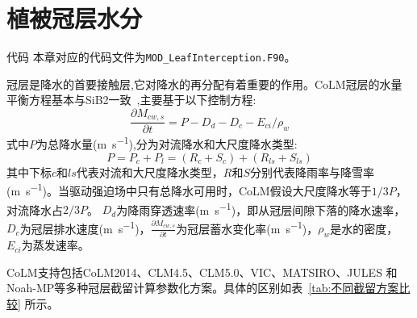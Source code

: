 
\chapter{植被冠层水分}\label{植被冠层截留}

\begin{mymdframed}{代码}
本章对应的代码文件为\texttt{MOD\_LeafInterception.F90}。
\end{mymdframed}

冠层是降水的首要接触层,它对降水的再分配有着重要的作用。CoLM冠层的水量平衡方程基本与SiB2一致~\citep{sellers1996revised},主要基于以下控制方程:
\begin{equation}\label{eq:冠层水量控制方程}
\frac{\partial M_{cw,s}}{\partial t} = P-D_{d}-D_{c}-E_{ci} / \rho_{w}
\end{equation}
式中$P$为总降水量(\unit{m.s^{-1}}),分为对流降水和大尺度降水类型:
\begin{equation}\label{eq:降水类型}
P=P_{c}+P_{l}=\left(R_{c}+S_{c}\right)+\left(R_{ls}+S_{ls}\right)
\end{equation}
其中下标$c$和$ls$代表对流和大尺度降水类型，$R$和$S$分别代表降雨率与降雪率(\unit{m.s^{-1}})。当驱动强迫场中只有总降水可用时，CoLM假设大尺度降水等于$1/3P$，对流降水占$2/3P$。
$D_d$为降雨穿透速率(\unit{m.s^{-1}})，即从冠层间隙下落的降水速率，$D_c$为冠层排水速度(\unit{m.s^{-1}})，$\frac{\partial M_{cw,s}}{\partial t}$为冠层蓄水变化率(\unit{m.s^{-1}})，$\rho_w$是水的密度，$E_{ci}$为蒸发速率。

CoLM支持包括CoLM2014、CLM4.5、CLM5.0、VIC、MATSIRO、JULES 和Noah-MP等多种冠层截留计算参数化方案。具体的区别如表~\ref{tab:不同截留方案比较} 所示。

